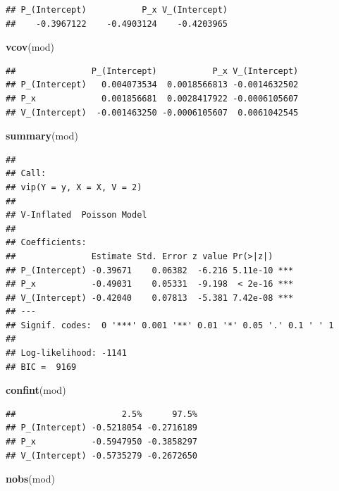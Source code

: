 \documentclass[]{article}
\newenvironment{Shaded}{\begin{snugshade}}{\end{snugshade}}
\newcommand{\KeywordTok}[1]{\textcolor[rgb]{0.13,0.29,0.53}{\textbf{#1}}}
\newcommand{\NormalTok}[1]{#1}
\begin{document}
\begin{verbatim}
## P_(Intercept)           P_x V_(Intercept) 
##    -0.3967122    -0.4903124    -0.4203965
\end{verbatim}

\begin{Shaded}
\begin{Highlighting}[]
\KeywordTok{vcov}\NormalTok{(mod)}
\end{Highlighting}
\end{Shaded}

\begin{verbatim}
##               P_(Intercept)           P_x V_(Intercept)
## P_(Intercept)   0.004073534  0.0018566813 -0.0014632502
## P_x             0.001856681  0.0028417922 -0.0006105607
## V_(Intercept)  -0.001463250 -0.0006105607  0.0061042545
\end{verbatim}

\begin{Shaded}
\begin{Highlighting}[]
\KeywordTok{summary}\NormalTok{(mod)}
\end{Highlighting}
\end{Shaded}

\begin{verbatim}
## 
## Call:
## vip(Y = y, X = X, V = 2)
## 
## V-Inflated  Poisson Model
## 
## Coefficients:
##               Estimate Std. Error z value Pr(>|z|)    
## P_(Intercept) -0.39671    0.06382  -6.216 5.11e-10 ***
## P_x           -0.49031    0.05331  -9.198  < 2e-16 ***
## V_(Intercept) -0.42040    0.07813  -5.381 7.42e-08 ***
## ---
## Signif. codes:  0 '***' 0.001 '**' 0.01 '*' 0.05 '.' 0.1 ' ' 1 
## 
## Log-likelihood: -1141 
## BIC =  9169
\end{verbatim}

\begin{Shaded}
\begin{Highlighting}[]
\KeywordTok{confint}\NormalTok{(mod)}
\end{Highlighting}
\end{Shaded}

\begin{verbatim}
##                     2.5%      97.5%
## P_(Intercept) -0.5218054 -0.2716189
## P_x           -0.5947950 -0.3858297
## V_(Intercept) -0.5735279 -0.2672650
\end{verbatim}

\begin{Shaded}
\begin{Highlighting}[]
\KeywordTok{nobs}\NormalTok{(mod)}
\end{Highlighting}
\end{Shaded}
\end{document}
